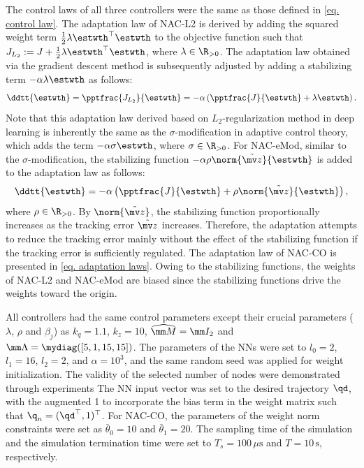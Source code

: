 \documentclass[letterpaper, 10 pt, conference]{ieeeconf}  %
\begin{document}
The control laws of all three controllers were the same as those defined in \eqref{eq. control law}.
The adaptation law of NAC-L2 is derived by adding the squared weight term $\tfrac{1}{2}\lambda{\estwth}^\top {\estwth}$ to the objective function such that $J_{L_2}:= J+\tfrac{1}{2}\lambda{\estwth}^\top {\estwth}$, where $\lambda\in\R_{>0}$.
The adaptation law obtained via the gradient descent method is subsequently adjusted by adding a stabilizing term $-\alpha\lambda{\estwth}$ as follows:
\begin{equation} 
    \ddtt{{\estwth}} = 
    \pptfrac{J_{L_2}}{\estwth}
    =-\alpha
    \left(
        \pptfrac{J}{\estwth}
        +
        \lambda{\estwth}
    \right)
    .
    \label{eq. adap L2}
\end{equation}
Note that this adaptation law derived based on $L_2$-regularization method in deep learning is inherently the same as the $\sigma$-modification in adaptive control theory, which adds the term $-\alpha\sigma{\estwth}$, where $\sigma\in\R_{>0}$.
For NAC-eMod, similar to the $\sigma$-modification, the stabilizing function $-\alpha\rho\norm{\tilde{\mv z}}{\estwth}$ is added to the adaptation law as follows:
\begin{equation}
    \ddtt{{\estwth}} = -\alpha
    \left(
        \pptfrac{J}{\estwth}
        +
        \rho\norm{\tilde {\mv z}}{\estwth}
    \right)
    ,
    \label{eq. adap eMod}
\end{equation}
where $\rho\in\R_{>0}$.
By $\norm{\tilde {\mv z}}$, the stabilizing function proportionally increases as the tracking error $\tilde {\mv z}$ increases.
Therefore, the adaptation attempts to reduce the tracking error mainly without the effect of the stabilizing function if the tracking error is sufficiently regulated.
The adaptation law of NAC-CO is presented in \eqref{eq. adaptation laws}.
Owing to the stabilizing functions, the weights of NAC-L2 and NAC-eMod are biased since the stabilizing functions drive the weights toward the origin.

All controllers had the same control parameters except their crucial parameters (\ie $\lambda$, $\rho$ and $\beta_j$) as $k_q=1.1$, $k_z=10$, $\widehat{\mm M}=\mm I_2$ and $\mm \Lambda=\mydiag([5,1,15,15])$.
The parameters of the NNs were set to $l_0=2$, $l_1=16$, $l_2=2$, and $\alpha=10^3$, and the same random seed was applied for weight initialization.
\color{red}    
    The validity of the selected number of nodes were demonstrated through experiments 
\color{black}
The NN input vector was set to the desired trajectory $\qd$, with the augmented 1 to incorporate the bias term in the weight matrix such that $\q_{n}=(\qd^\top ,1)^\top $.
For NAC-CO, the parameters of the weight norm constraints were set as $\bar\theta_0=10$ and $\bar\theta_1=20$.
The sampling time of the simulation and the simulation termination time were set to $T_s=100\,\mu\mathrm{s}$ and $T=10\,\mathrm{s}$, respectively.
\end{document}
